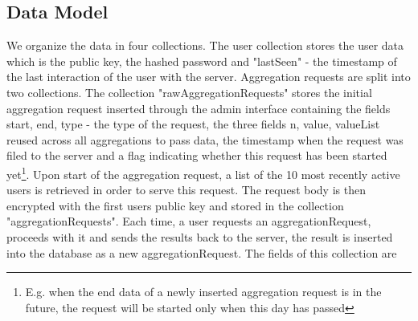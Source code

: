 \subsection{Data Model}
We organize the data in four collections. The user collection stores the user data which is the public key, the hashed password and "lastSeen" - the timestamp of the last interaction of the user with the server. Aggregation requests are split into two collections. The collection "rawAggregationRequests" stores the initial aggregation request inserted through the admin interface containing the fields start, end, type - the type of the request, the three fields n, value, valueList reused across all aggregations to pass data, the timestamp when the request was filed to the server and a flag indicating whether this request has been started yet\footnote{E.g. when the end data of a newly inserted aggregation request is in the future, the request will be started only when this day has passed}. Upon start of the aggregation request, a list of the 10 most recently active users is retrieved in order to serve this request. The request body is then encrypted with the first users public key and stored in the collection "aggregationRequests". Each time, a user requests an aggregationRequest, proceeds with it and sends the results back to the server, the result is inserted into the database as a new aggregationRequest. The fields of this collection are 

